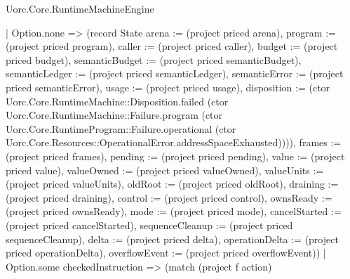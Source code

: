 \begin{lexlean}{Uorc.Core.RuntimeMachineEngine}
\begin{semanticmodule}
{            | Option.none => (record State {arena := (project priced arena), program := (project priced program), caller := (project priced caller), budget := (project priced budget), semanticBudget := (project priced semanticBudget), semanticLedger := (project priced semanticLedger), semanticError := (project priced semanticError), usage := (project priced usage), disposition := (ctor Uorc.Core.RuntimeMachine::Disposition.failed (ctor Uorc.Core.RuntimeMachine::Failure.program (ctor Uorc.Core.RuntimeProgram::Failure.operational (ctor Uorc.Core.Resources::OperationalError.addressSpaceExhausted)))), frames := (project priced frames), pending := (project priced pending), value := (project priced value), valueOwned := (project priced valueOwned), valueUnits := (project priced valueUnits), oldRoot := (project priced oldRoot), draining := (project priced draining), control := (project priced control), ownsReady := (project priced ownsReady), mode := (project priced mode), cancelStarted := (project priced cancelStarted), sequenceCleanup := (project priced sequenceCleanup), delta := (project priced delta), operationDelta := (project priced operationDelta), overflowEvent := (project priced overflowEvent)})
            | Option.some checkedInstruction => (match (project f action)
}
\end{semanticmodule}
\end{lexlean}
